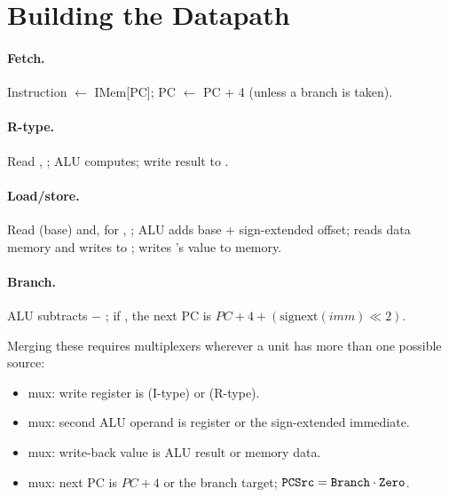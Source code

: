 \section{Building the Datapath}

\paragraph{Fetch.} Instruction $\gets$ IMem[PC]; PC $\gets$ PC + 4
(unless a branch is taken).

\paragraph{R-type.} Read , ; ALU computes; write result
to .

\paragraph{Load/store.} Read  (base) and, for ,
; ALU adds base + sign-extended offset;  reads data memory
and writes to ;  writes 's value to memory.

\paragraph{Branch.} ALU subtracts  $-$ ; if
, the next PC is $PC + 4 + (\text{signext}(imm) \ll 2)$.

Merging these requires multiplexers wherever a unit has more than one
possible source:
\begin{itemize}
  \item {} mux: write register is  (I-type) or
     (R-type).
  \item {} mux: second ALU operand is register  or the
    sign-extended immediate.
  \item {} mux: write-back value is ALU result or memory data.
  \item {} mux: next PC is $PC+4$ or the branch target;
    $\texttt{PCSrc} = \texttt{Branch} \cdot \texttt{Zero}$.
\end{itemize}


